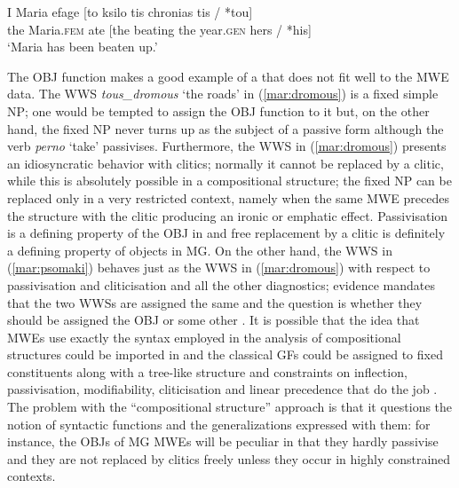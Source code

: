 \documentclass[output=paper]{langsci/langscibook}
\begin{document}
\ea\label{mar:xronias}
\gll I Maria             efage  \textnormal{[}to ksilo        tis     chronias       tis    / *tou\textnormal{]}\\
           the Maria.\textsc{fem} ate       [the beating  the    year.\textsc{gen}    hers  / *his]\\
\glt `Maria has been beaten up.'
\z

The OBJ function makes a good example of a  that does not fit well to the MWE data. The WWS \textit{tous\_dromous} `the roads' in (\ref{mar:dromous}) is a fixed simple NP; one would be tempted to assign the OBJ function to it but, on the other hand, the fixed NP never turns up as the subject of a passive form although the verb \textit{perno} `take' passivises. Furthermore, the WWS in (\ref{mar:dromous}) presents an idiosyncratic behavior with clitics; normally it cannot be replaced by a clitic, while this is absolutely possible in a compositional structure; the fixed NP can be replaced only in a very restricted context, namely when the same MWE precedes the structure with the clitic \citep{markantonatou2017} producing an ironic or emphatic effect. Passivisation is a defining property of the OBJ  in  \citep{dalrymplelfg} and free replacement by a clitic is definitely a defining property of objects in MG. On the other hand, the WWS in (\ref{mar:psomaki}) behaves just as the WWS in (\ref{mar:dromous}) with respect to passivisation and cliticisation and all the other  diagnostics; evidence mandates that the two WWSs are assigned the same  and the question is whether they should be assigned the OBJ  or some other .  It is possible that the idea that MWEs use exactly the syntax employed in the analysis of compositional structures \citep{gross1988a,gross1988b,kay2012,bargmann2017}
could be imported in  and the classical GFs could be assigned to fixed constituents along with a tree-like structure and constraints on inflection, passivisation, modifiability, cliticisation and linear precedence that do the job \citep{waszczuk2015}. The problem with the  ``compositional structure'' approach is that it questions the notion of syntactic functions and the generalizations expressed with them: for instance, the OBJs of MG MWEs will be peculiar in that they hardly passivise and they are not replaced by clitics freely unless they occur in highly constrained contexts. 
\end{document}
